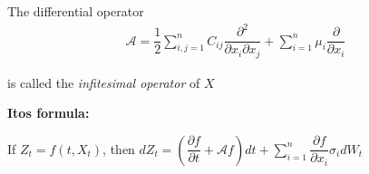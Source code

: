 \par\bigskip
\begin{defo}{}
  The differential operator
  \begin{equation*}
    \begin{gathered}
      \mathcal{A} = \dfrac{1}{2}\sum_{i,j=1}^{n}C_{ij}\dfrac{\partial ^2}{\partial x_i\partial x_j} + \sum_{i=1}^{n}\mu_i\dfrac{\partial }{\partial x_i}
    \end{gathered}
  \end{equation*}\par
  \noindent is called the \textit{infitesimal operator} of $X$
\end{defo}
\par\bigskip
\noindent\textbf{Itos formula:}\par
\noindent If $Z_t = f(t,X_t)$, then $dZ_t = \left(\dfrac{\partial f}{\partial t}+\mathcal{A}f\right)dt + \sum_{i=1}^{n}\dfrac{\partial f}{\partial x_i}\sigma_idW_t$
